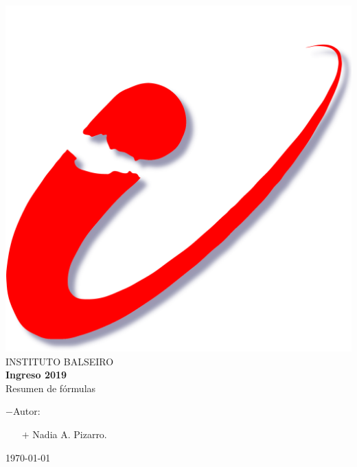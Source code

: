 \documentclass[12pt,a4paper]{article}
\date{\small{\today}}
\begin{document}
  \begin{center}


    \includegraphics[scale=0.15]{ib}
    \vspace{1cm}
    \vspace{1cm}
    \\
    \Huge{INSTITUTO BALSEIRO}
    \vspace{2cm}\\
    \huge{\textbf{Ingreso 2019}}\\
    \vspace{1cm}
    \LARGE{Resumen de fórmulas}\\
    \vspace{1cm}
    \large
    \begin{flushleft}

      $-$Autor:\\
      \begin{itemize}

        \item[$+$] Nadia A. Pizarro.

      \end{itemize}

    \end{flushleft}
    \vspace{0,5cm}

    \today
    \thispagestyle{empty}
  \end{center}
\end{document}
